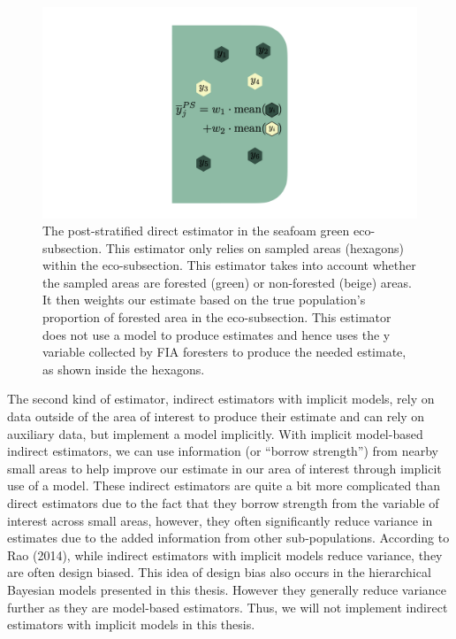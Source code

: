 \documentclass[12pt,twoside]{reedthesis}
\begin{document}
\begin{figure}

{\centering \includegraphics[width=1\linewidth]{figure/ps-diagram} 

}

\caption[The post-stratified direct estimator]{The post-stratified direct estimator in the seafoam green eco-subsection. This estimator only relies on sampled areas (hexagons) within the eco-subsection. This estimator takes into account whether the sampled areas are forested (green) or non-forested (beige) areas. It then weights our estimate based on the true population's proportion of forested area in the eco-subsection. This estimator does not use a model to produce estimates and hence uses the y variable collected by FIA foresters to produce the needed estimate, as shown inside the hexagons.}\label{fig:ps-diagram}
\end{figure}
The second kind of estimator, indirect estimators with implicit models, rely on data outside of the area of interest to produce their estimate and can rely on auxiliary data, but implement a model implicitly. With implicit model-based indirect estimators, we can use information (or ``borrow strength'') from nearby small areas to help improve our estimate in our area of interest through implicit use of a model. These indirect estimators are quite a bit more complicated than direct estimators due to the fact that they borrow strength from the variable of interest across small areas, however, they often significantly reduce variance in estimates due to the added information from other sub-populations. According to Rao (2014), while indirect estimators with implicit models reduce variance, they are often design biased. This idea of design bias also occurs in the hierarchical Bayesian models presented in this thesis. However they generally reduce variance further as they are model-based estimators. Thus, we will not implement indirect estimators with implicit models in this thesis.
\end{document}
